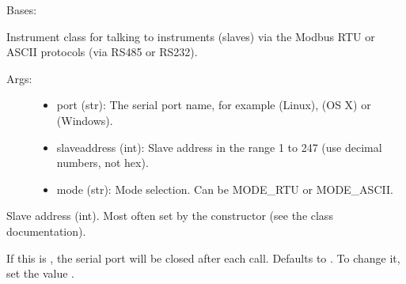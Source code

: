 \documentclass[letterpaper,10pt,english]{sphinxmanual}
\begin{document}
\begin{fulllineitems}
\label{minimalmodbus:minimalmodbus.Instrument}
Bases: 

Instrument class for talking to instruments (slaves) via the Modbus RTU or ASCII protocols (via RS485 or RS232).
\begin{description}
\item[{Args:}] \leavevmode\begin{itemize}
\item {} 
port (str): The serial port name, for example  (Linux),  (OS X) or  (Windows).

\item {} 
slaveaddress (int): Slave address in the range 1 to 247 (use decimal numbers, not hex).

\item {} 
mode (str): Mode selection. Can be MODE\_RTU or MODE\_ASCII.

\end{itemize}

\end{description}

\begin{fulllineitems}
\label{minimalmodbus:minimalmodbus.Instrument.__init__}
\end{fulllineitems}


\begin{fulllineitems}
\label{minimalmodbus:minimalmodbus.Instrument.address}
Slave address (int). Most often set by the constructor (see the class documentation).

\end{fulllineitems}


\begin{fulllineitems}
\label{minimalmodbus:minimalmodbus.Instrument.close_port_after_each_call}
If this is , the serial port will be closed after each call. Defaults to {\hyperref[minimalmodbus:minimalmodbus.CLOSE_PORT_AFTER_EACH_CALL]{}}. To change it, set the value  .


\end{fulllineitems}
\end{fulllineitems}
\end{document}
